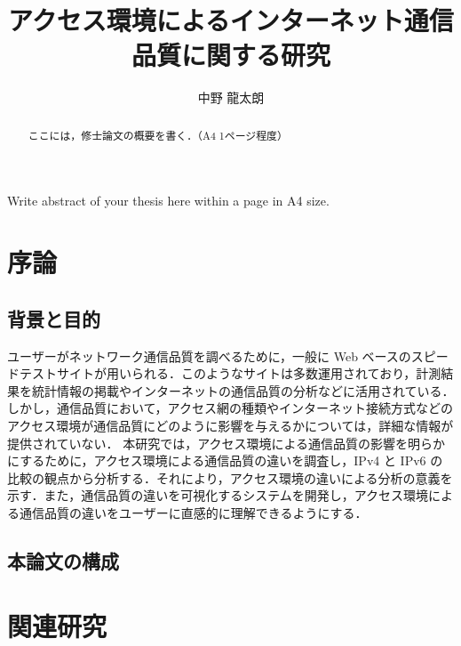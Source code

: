 \documentclass[12pt,dvipdfmx]{mthesis_utf8}
\title{アクセス環境によるインターネット通信品質に関する研究}
\author{中野 龍太朗}
\begin{document}
\maketitle
\begin{abstract}
ここには，修士論文の概要を書く．（A4 1ページ程度）
\end{abstract}

\begin{eabstract}
Write abstract of your thesis here within a page in A4 size.
\end{eabstract}



\chapter{序論}
\section{背景と目的}
ユーザーがネットワーク通信品質を調べるために，一般に Web ベースのスピードテストサイトが用いられる．このようなサイトは多数運用されており，計測結果を統計情報の掲載やインターネットの通信品質の分析などに活用されている．しかし，通信品質において，アクセス網の種類やインターネット接続方式などのアクセス環境が通信品質にどのように影響を与えるかについては，詳細な情報が提供されていない．
本研究では，アクセス環境による通信品質の影響を明らかにするために，アクセス環境による通信品質の違いを調査し，IPv4 と IPv6 の比較の観点から分析する．それにより，アクセス環境の違いによる分析の意義を示す．また，通信品質の違いを可視化するシステムを開発し，アクセス環境による通信品質の違いをユーザーに直感的に理解できるようにする．

\section{本論文の構成}


\chapter{関連研究}
\label{chap:relatedwork}

\end{document}
